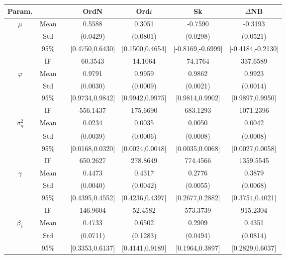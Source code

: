 \begin{table} 
\center 
\begin{footnotesize}
\tabcolsep=0.07cm
\begin{singlespace}
{\begin{subtable}{0.8\textwidth}
\begin{tabular}{ccc cccc } 
\toprule 
Param. &&& OrdN  & Ord$t$ & Sk & $\Delta$NB \\ \hline
 $\mu$   & Mean   &  &  0.5588  &  0.3051  &  -0.7590  &  -0.3193  \\  
 & Std   &  &  (0.0429)  &  (0.0801)  &  (0.0298)  &  (0.0521)  \\  
 & 95\%  &  &  [0.4750,0.6430]  &  [0.1500,0.4654]  &  [-0.8169,-0.6999]  &  [-0.4184,-0.2130]  \\  
 & IF  &  &  60.3543  &  14.1064  &  74.1764  &  337.6589  \\ [1.0ex] 
 $\varphi$   & Mean   &  &  0.9791  &  0.9959  &  0.9862  &  0.9923  \\  
 & Std   &  &  (0.0030)  &  (0.0009)  &  (0.0021)  &  (0.0014)  \\  
 & 95\%  &  &  [0.9734,0.9842]  &  [0.9942,0.9975]  &  [0.9814,0.9902]  &  [0.9897,0.9950]  \\  
 & IF  &  &  556.1437  &  175.6690  &  683.1293  &  1071.2396  \\ [1.0ex] 
 $\sigma^2_{\eta}$   & Mean   &  &  0.0234  &  0.0035  &  0.0050  &  0.0042  \\  
 & Std   &  &  (0.0039)  &  (0.0006)  &  (0.0008)  &  (0.0008)  \\  
 & 95\%  &  &  [0.0168,0.0320]  &  [0.0024,0.0048]  &  [0.0035,0.0068]  &  [0.0027,0.0058]  \\  
 & IF  &  &  650.2627  &  278.8649  &  774.4566  &  1359.5545  \\ [1.0ex] 
 $\gamma$   & Mean   &  &  0.4473  &  0.4317  &  0.2776  &  0.3879  \\  
 & Std   &  &  (0.0040)  &  (0.0042)  &  (0.0055)  &  (0.0068)  \\  
 & 95\%  &  &  [0.4395,0.4552]  &  [0.4236,0.4397]  &  [0.2677,0.2882]  &  [0.3754,0.4021]  \\  
 & IF  &  &  146.9604  &  52.4582  &  573.3739  &  915.2304  \\ [1.0ex] 
 $\beta_1$   & Mean   &  &  0.4733  &  0.6502  &  0.2909  &  0.4351  \\  
 & Std   &  &  (0.0711)  &  (0.1283)  &  (0.0494)  &  (0.0814)  \\  
 & 95\%  &  &  [0.3353,0.6137]  &  [0.4141,0.9189]  &  [0.1964,0.3897]  &  [0.2829,0.6037]  \\  

\end{tabular}
\end{subtable}}
\end{singlespace}
\end{footnotesize}
\end{table}
